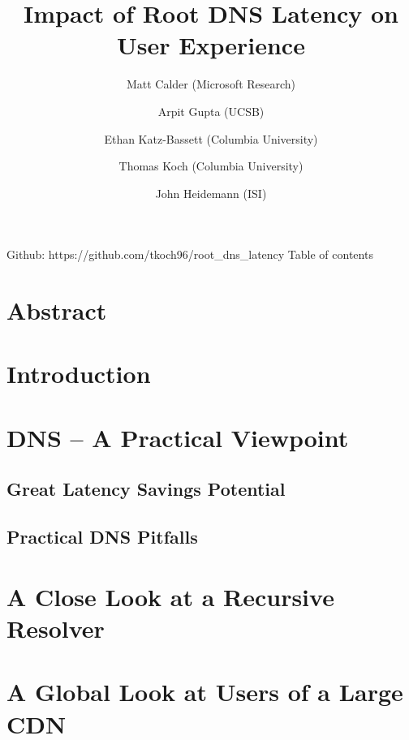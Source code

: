 \documentclass[sigconf,nonacm,10pt]{acmart}
\title{Impact of Root DNS Latency on User Experience}
\author{
            Matt Calder (Microsoft Research)
         \and 
            Arpit Gupta (UCSB)
         \and 
            Ethan Katz-Bassett (Columbia University)
         \and 
            Thomas Koch (Columbia University)
         \and 
            John Heidemann (ISI)
        }
\date{}
\begin{document}
\maketitle

\iffalse

Github: https://github.com/tkoch96/root\_dns\_latency Table of contents

\section*{Abstract}\label{abstract}

\section{Introduction}\label{introduction}

\section{DNS -- A Practical Viewpoint}\label{dns-a-practical-viewpoint}

\subsection{Great Latency Savings
Potential}\label{great-latency-savings-potential}

\subsection{Practical DNS Pitfalls}\label{practical-dns-pitfalls}

\section{A Close Look at a Recursive
Resolver}\label{a-close-look-at-a-recursive-resolver}

\section{A Global Look at Users of a Large
CDN}\label{a-global-look-at-users-of-a-large-cdn}
\end{document}
